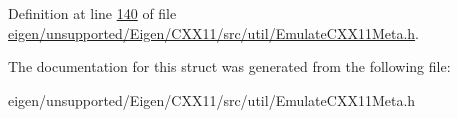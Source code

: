 Definition at line \hyperlink{eigen_2unsupported_2_eigen_2_c_x_x11_2src_2util_2_emulate_c_x_x11_meta_8h_source_l00140}{140} of file \hyperlink{eigen_2unsupported_2_eigen_2_c_x_x11_2src_2util_2_emulate_c_x_x11_meta_8h_source}{eigen/unsupported/\+Eigen/\+C\+X\+X11/src/util/\+Emulate\+C\+X\+X11\+Meta.\+h}.



The documentation for this struct was generated from the following file\+:\begin{DoxyCompactItemize}
\item 
eigen/unsupported/\+Eigen/\+C\+X\+X11/src/util/\+Emulate\+C\+X\+X11\+Meta.\+h\end{DoxyCompactItemize}
